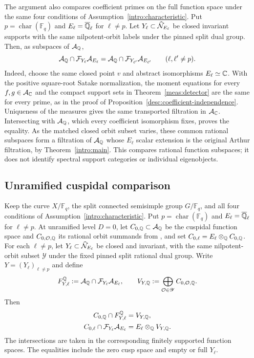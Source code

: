 The argument also compares coefficient primes on the full function space
under the same four conditions of Assumption~\ref{intro:characteristic}.
Put $p=\operatorname{char}(\mathbb F_q)$ and
$E_\ell=\overline{\mathbb Q}_\ell$ for $\ell\ne p$. Let
$Y_\ell\subset\widehat{\mathcal N}_{E_\ell}$ be closed invariant supports with the same
nilpotent-orbit labels under the pinned split dual group. Then, as
subspaces of $\mathcal A_\mathbb Q$,
\[
 \mathcal A_\mathbb Q\cap\mathcal F_{Y_\ell}\mathcal A_{E_\ell}
 =\mathcal A_\mathbb Q\cap\mathcal F_{Y_{\ell'}}\mathcal A_{E_{\ell'}}
 \qquad(\ell,\ell'\ne p).
\]
Indeed, choose the same closed point $v$ and abstract isomorphisms
$E_\ell\simeq\mathbb C$. With the positive square-root Satake normalization,
the moment equations for every $f,g\in\mathcal A_\mathbb C$ and the compact support
sets in Theorem~\ref{meas:detector} are the same for every prime, as in
the proof of Proposition~\ref{desc:coefficient-independence}. Uniqueness
of the measures gives the same transported filtration in $\mathcal A_\mathbb C$.
Intersecting with $\mathcal A_\mathbb Q$, which every coefficient isomorphism fixes,
proves the equality. As the matched closed orbit subset varies, these
common rational subspaces form a filtration of $\mathcal A_\mathbb Q$ whose
$E_\ell$ scalar extension is the original Arthur filtration, by
Theorem~\ref{intro:main}. This compares rational function subspaces;
it does not identify spectral support categories or individual
eigenobjects.

\subsection{Unramified cuspidal comparison}

\begin{corollary}
\label{desc:cuspidal-comparison}
Keep the curve $X/\mathbb F_q$, the split connected semisimple group
$G/\mathbb F_q$, and all four conditions of
Assumption~\ref{intro:characteristic}. Put
$p=\operatorname{char}(\mathbb F_q)$ and
$E_\ell=\overline{\mathbb Q}_\ell$ for $\ell\ne p$. At unramified level $D=0$,
let $C_{0,\mathbb Q}\subset\mathcal A_\mathbb Q$ be the cuspidal function space and
$C_{0,\mathcal O,\mathbb Q}$ its rational orbit summands from
\cite[Theorem~1.1]{CuspidalArthur}, and set
$C_{0,\ell}=E_\ell\otimes_\mathbb Q C_{0,\mathbb Q}$.
For each $\ell\ne p$, let $Y_\ell\subset\widehat{\mathcal N}_{E_\ell}$ be closed and
invariant, with the same nilpotent-orbit subset $\mathscr Y$ under the
fixed pinned split rational dual group. Write $Y=(Y_\ell)_{\ell\ne p}$ and
define
\[
 F^{\mathbb Q}_{Y,\ell}:=\mathcal A_\mathbb Q\cap\mathcal F_{Y_\ell}\mathcal A_{E_\ell},
 \qquad
 V_{Y,\mathbb Q}:=\bigoplus_{\mathcal O\in\mathscr Y}C_{0,\mathcal O,\mathbb Q}.
\]
Then
\begin{equation}\label{desc:cuspidal-equalities}
 \begin{split}
 C_{0,\mathbb Q}\cap F^{\mathbb Q}_{Y,\ell}&=V_{Y,\mathbb Q},\\
 C_{0,\ell}\cap\mathcal F_{Y_\ell}\mathcal A_{E_\ell}
   &=E_\ell\otimes_\mathbb Q V_{Y,\mathbb Q}.
 \end{split}
\end{equation}
The intersections are taken in the corresponding finitely supported
function spaces. The equalities include the zero cusp space and empty or
full $Y_\ell$.
\end{corollary}

